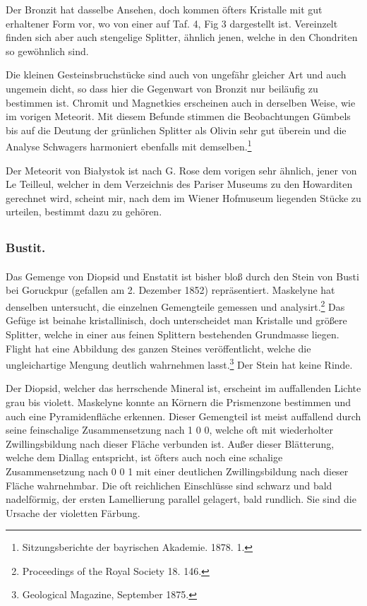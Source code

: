 \documentclass[a4paper, 12pt, oneside]{article}
\begin{document}
Der Bronzit hat dasselbe Ansehen, doch kommen öfters Kristalle mit gut erhaltener Form vor, wo von einer auf Taf. 4, Fig 3 dargestellt ist. Vereinzelt finden sich aber auch stengelige Splitter, ähnlich jenen, welche in den Chondriten so gewöhnlich sind.

Die kleinen Gesteinsbruchstücke sind auch von ungefähr gleicher Art und auch ungemein dicht, so dass hier die Gegenwart von Bronzit nur beiläufig zu bestimmen ist. Chromit und Magnetkies erscheinen auch in derselben Weise, wie im vorigen Meteorit. Mit diesem Befunde stimmen die Beobachtungen Gümbels bis auf die Deutung der grünlichen Splitter als Olivin sehr gut überein und die Analyse Schwagers harmoniert ebenfalls mit demselben.\footnote{Sitzungsberichte der bayrischen Akademie. 1878. 1.}

Der Meteorit von Białystok ist nach G. Rose dem vorigen sehr ähnlich, jener von Le Teilleul, welcher in dem Verzeichnis des Pariser Museums zu den Howarditen gerechnet wird, scheint mir, nach dem im Wiener Hofmuseum liegenden Stücke zu urteilen, bestimmt dazu zu gehören.
\clearpage
\subsection{}
\subsubsection{Bustit.}
\paragraph{}
Das Gemenge von Diopsid und Enstatit ist bisher bloß durch den Stein von Busti bei Goruckpur (gefallen am 2. Dezember 1852) repräsentiert. Maskelyne hat denselben untersucht, die einzelnen Gemengteile gemessen und analysirt.\footnote{Proceedings of the Royal Society 18. 146.} Das Gefüge ist beinahe kristallinisch, doch unterscheidet man Kristalle und größere Splitter, welche in einer aus feinen Splittern bestehenden Grundmasse liegen. Flight hat eine Abbildung des ganzen Steines veröffentlicht, welche die ungleichartige Mengung deutlich wahrnehmen lasst.\footnote{Geological Magazine, September 1875.} Der Stein hat keine Rinde.

Der Diopsid, welcher das herrschende Mineral ist, erscheint im auffallenden Lichte grau bis violett. Maskelyne konnte an Körnern die Prismenzone bestimmen und auch eine Pyramidenfläche erkennen. Dieser Gemengteil ist meist auffallend durch seine feinschalige Zusammensetzung nach 1 0 0, welche oft mit wiederholter Zwillingsbildung nach dieser Fläche verbunden ist. Außer dieser Blätterung, welche dem Diallag entspricht, ist öfters auch noch eine schalige Zusammensetzung nach 0 0 1 mit einer deutlichen Zwillingsbildung nach dieser Fläche wahrnehmbar. Die oft reichlichen Einschlüsse sind schwarz und bald nadelförmig, der ersten Lamellierung parallel gelagert, bald rundlich. Sie sind die Ursache der violetten Färbung.
\end{document}
